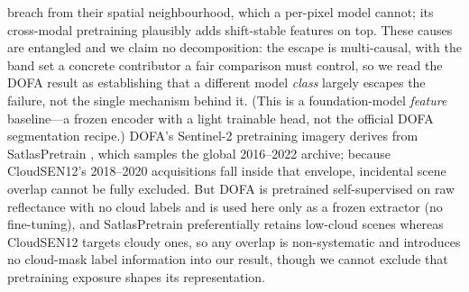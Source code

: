 \documentclass[preprint,3p,times]{elsarticle}
\begin{document}
breach from their spatial neighbourhood, which a per-pixel model cannot; its cross-modal pretraining plausibly adds shift-stable features on top. These causes are entangled and we claim no decomposition: the escape is multi-causal, with the band set a concrete contributor a fair comparison must control, so we read the DOFA result as establishing that a different model \emph{class} largely escapes the failure, not the single mechanism behind it. (This is a foundation-model \emph{feature} baseline---a frozen encoder with a light trainable head, not the official DOFA segmentation recipe.) DOFA's Sentinel-2 pretraining imagery derives from SatlasPretrain \citep{bastani2023}, which samples the global 2016--2022 archive; because CloudSEN12's 2018--2020 acquisitions fall inside that envelope, incidental scene overlap cannot be fully excluded. But DOFA is pretrained self-supervised on raw reflectance with no cloud labels and is used here only as a frozen extractor (no fine-tuning), and SatlasPretrain preferentially retains low-cloud scenes whereas CloudSEN12 targets cloudy ones, so any overlap is non-systematic and introduces no cloud-mask label information into our result, though we cannot exclude that pretraining exposure shapes its representation.
\end{document}
